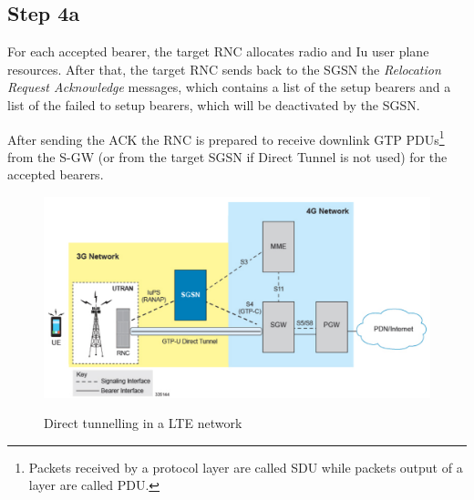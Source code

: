 \subsection*{Step 4a}
For each accepted bearer, the target RNC allocates radio and Iu
user plane resources. After that, the target RNC sends back to the SGSN the
\emph{Relocation Request Acknowledge} messages, which contains a list of the
setup bearers and a list of the failed to setup bearers, which will be deactivated
by the SGSN.

After sending the ACK the RNC is prepared to receive downlink GTP
PDUs\footnote{Packets received by a protocol layer are called SDU while packets
output of a layer are called PDU.}
from the S-GW (or from the target SGSN if Direct Tunnel is not used) for the
accepted bearers.

\begin{figure}[!htb]
	\centering
	\includegraphics[width=1\linewidth]{img/direct-tunnelling.png}
	\label{fig:direct-tunnelling}
	\caption{Direct tunnelling in a LTE network \protect\cite{direct-tunnelling}}
\end{figure}






